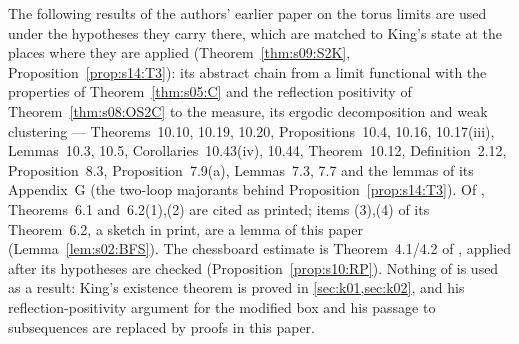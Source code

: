 \begin{remark}\label{rem:s03:companion-inputs}
The following results of the authors' earlier paper on the torus limits \cite{SymPhase} are used under the hypotheses they carry there, which are matched to King's state at the places where they are applied (Theorem~\ref{thm:s09:S2K}, Proposition~\ref{prop:s14:T3}): its abstract chain from a limit functional with the properties of Theorem~\ref{thm:s05:C} and the reflection positivity of Theorem~\ref{thm:s08:OS2C} to the measure, its ergodic decomposition and weak clustering --- Theorems~10.10, 10.19, 10.20, Propositions~10.4, 10.16, 10.17(iii), Lemmas~10.3, 10.5, Corollaries~10.43(iv), 10.44, Theorem~10.12, Definition~2.12, Proposition~8.3, Proposition~7.9(a), Lemmas~7.3, 7.7 and the lemmas of its Appendix~G (the two-loop majorants behind Proposition~\ref{prop:s14:T3}).
Of \cite{BFS1}, Theorems~6.1 and~6.2(1),(2) are cited as printed; items (3),(4) of its Theorem~6.2, a sketch in print, are a lemma of this paper (Lemma~\ref{lem:s02:BFS}). The chessboard estimate is Theorem~4.1/4.2 of \cite{FILS78}, applied after its hypotheses are checked (Proposition~\ref{prop:s10:RP}). Nothing of \cite{K1,K2} is used as a result: King's existence theorem is proved in \cref{sec:k01,sec:k02}, and his reflection-positivity argument for the modified box and his passage to subsequences are replaced by proofs in this paper.
\end{remark}
